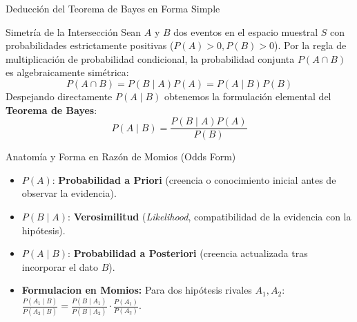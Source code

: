 \documentclass[10pt, aspectratio=169]{beamer}
\begin{document}
\begin{frame}{Deducción del Teorema de Bayes en Forma Simple}
  \fontsize{7.5pt}{9pt}\selectfont
  \begin{block}{Simetría de la Intersección}
    \fontsize{7.5pt}{9pt}\selectfont
    Sean $A$ y $B$ dos eventos en el espacio muestral $S$ con probabilidades estrictamente positivas ($P(A)>0, P(B)>0$). Por la regla de multiplicación de probabilidad condicional, la probabilidad conjunta $P(A \cap B)$ es algebraicamente simétrica:
    $$P(A \cap B) = P(B \mid A)P(A) = P(A \mid B)P(B)$$
    Despejando directamente $P(A \mid B)$ obtenemos la formulación elemental del \textbf{Teorema de Bayes}:
    $$P(A \mid B) = \frac{P(B \mid A)P(A)}{P(B)}$$
  \end{block}
  \vspace{-0.15cm}
  \pause
  \begin{alertblock}{Anatomía y Forma en Razón de Momios (Odds Form)}
    \fontsize{7.5pt}{9pt}\selectfont
    \begin{itemize}\itemsep=0.08cm
      \item $P(A)$: \textbf{Probabilidad a Priori} (creencia o conocimiento inicial antes de observar la evidencia).
      \item $P(B \mid A)$: \textbf{Verosimilitud} (\emph{Likelihood}, compatibilidad de la evidencia con la hipótesis).
      \item $P(A \mid B)$: \textbf{Probabilidad a Posteriori} (creencia actualizada tras incorporar el dato $B$).
      \item \textbf{Formulacion en Momios:} Para dos hipótesis rivales $A_1, A_2$: $\displaystyle \frac{P(A_1 \mid B)}{P(A_2 \mid B)} = \frac{P(B \mid A_1)}{P(B \mid A_2)} \cdot \frac{P(A_1)}{P(A_2)}$.
    \end{itemize}
  \end{alertblock}
\end{frame}
\end{document}
